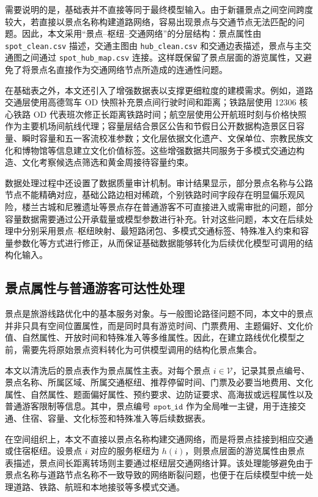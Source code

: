 \documentclass[UTF8,zihao=-4,a4paper]{ctexart}
\begin{document}
需要说明的是，基础表并不直接等同于最终模型输入。由于新疆景点之间空间跨度较大，若直接以景点名称构建道路网络，容易出现景点与交通节点无法匹配的问题。因此，本文采用“景点--枢纽--交通网络”的分层结构：景点属性由 \texttt{spot\_clean.csv} 描述，交通主图由 \texttt{hub\_clean.csv} 和交通边表描述，景点与主交通图之间通过 \texttt{spot\_hub\_map.\allowbreak csv} 连接。这样既保留了景点层面的游览属性，又避免了将景点名直接作为交通网络节点所造成的连通性问题。

在基础表之外，本文还引入了增强数据表以支撑更细粒度的建模需求。例如，道路交通层使用高德驾车 OD 快照补充景点间行驶时间和距离；铁路层使用 12306 核心铁路 OD 代表班次修正长距离铁路时间；航空层使用公开航班时刻与价格快照作为主要机场间航线代理；容量层结合景区公告和节假日公开数据构造景区日容量、瞬时容量和五一客流校准参数；文化层依据文化遗产、文保单位、宗教民族文化和博物馆等信息建立文化价值标签。这些增强数据共同服务于多模式交通边构造、文化考察候选点筛选和黄金周接待容量约束。

数据处理过程中还设置了数据质量审计机制。审计结果显示，部分景点名称与公路节点不能精确对应，基础公路边相对稀疏，个别铁路时间字段存在明显偏乐观风险，楼兰古城和尼雅遗址等景点存在普通游客不可直接进入或需审批的问题，部分容量数据需要通过公开承载量或模型参数进行补充。针对这些问题，本文在后续处理中分别采用景点--枢纽映射、最短路闭包、多模式交通标签、特殊准入约束和容量参数化等方式进行修正，从而保证基础数据能够转化为后续优化模型可调用的结构化输入。

\subsection{景点属性与普通游客可达性处理}
\label{subsec:spot_attributes_accessibility}

景点是旅游线路优化中的基本服务对象。与一般图论路径问题不同，本文中的景点并非只具有空间位置属性，而是同时具有游览时间、门票费用、主题偏好、文化价值、自然属性、开放时间和特殊准入等多维属性。因此，在建立路线优化模型之前，需要先将原始景点资料转化为可供模型调用的结构化景点集合。

本文以清洗后的景点表作为景点属性主表。对每个景点 $i\in \mathcal{V}$，记录其景点编号、景点名称、所属区域、所属交通枢纽、推荐停留时间、门票及必要当地费用、文化属性、自然属性、题面偏好属性、预约要求、边防证要求、高海拔或远程属性以及普通游客限制等信息。其中，景点编号 $\texttt{spot\_id}$ 作为全局唯一主键，用于连接交通、住宿、容量、文化标签和特殊准入等后续数据表。

在空间组织上，本文不直接以景点名称构建交通网络，而是将景点挂接到相应交通或住宿枢纽。设景点 $i$ 对应的服务枢纽为 $h(i)$，则景点层面的游览属性由景点表描述，景点间长距离转场则主要通过枢纽层交通网络计算。该处理能够避免由于景点名称与道路节点名称不一致导致的网络断裂问题，也便于在后续模型中统一处理道路、铁路、航班和本地接驳等多模式交通。
\end{document}
